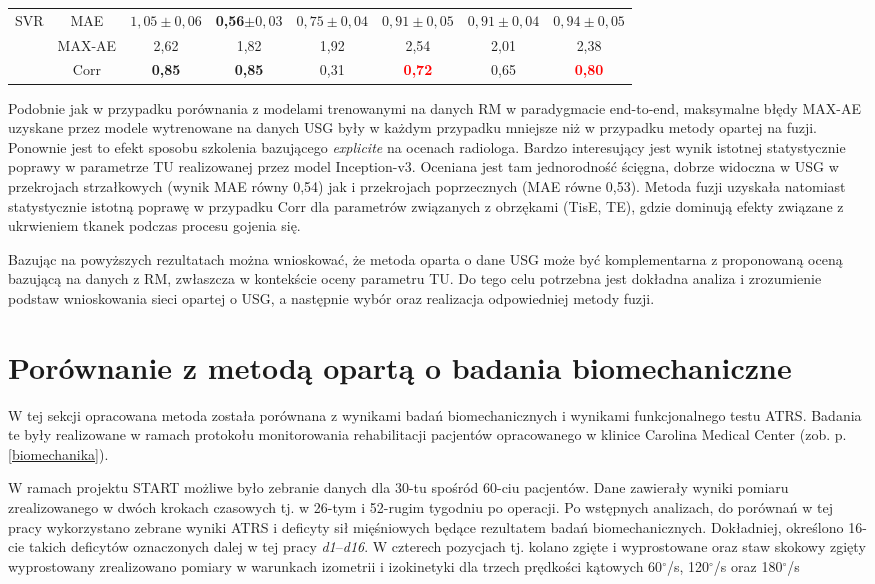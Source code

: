 \begin{table}[h]
\begin{tabular}{lc||c|c|c|c|c|c}
		SVR & MAE & $1,05\pm0,06$ & \textbf{0,56}$\pm0,03$ & $0,75\pm0,04$ & $0,91\pm0,05$ & $0,91\pm0,04$ & $0,94\pm0,05$\\
		& MAX-AE & 2,62 & 1,82 & 1,92 & 2,54 & 2,01 & 2,38 \\
		& Corr   & \textbf{0,85} & \textbf{0,85} & 0,31 & \textcolor{red}{\textbf{0,72}} & 0,65 & \textcolor{red}{\textbf{0,80}} \\
		 
	\end{tabular}
\end{table}
\renewcommand{\arraystretch}{1}

Podobnie jak w przypadku porównania z modelami trenowanymi na danych RM w paradygmacie end-to-end, maksymalne błędy MAX-AE uzyskane przez modele wytrenowane na danych USG były w każdym przypadku mniejsze niż w przypadku metody opartej na fuzji. Ponownie jest to efekt sposobu szkolenia bazującego \textit{explicite} na ocenach radiologa. Bardzo interesujący jest wynik istotnej statystycznie poprawy w parametrze TU realizowanej przez model Inception-v3. Oceniana jest tam jednorodność ścięgna, dobrze widoczna w USG w przekrojach strzałkowych (wynik MAE równy 0,54) jak i przekrojach poprzecznych (MAE równe 0,53). Metoda fuzji uzyskała natomiast statystycznie istotną poprawę w przypadku Corr dla parametrów związanych z obrzękami (TisE, TE), gdzie dominują efekty związane z ukrwieniem tkanek podczas procesu gojenia się.

Bazując na powyższych rezultatach można wnioskować, że metoda oparta o dane USG może być komplementarna z proponowaną oceną bazującą na danych \linebreak z RM, zwłaszcza w kontekście oceny parametru TU. Do tego celu potrzebna jest dokładna analiza i zrozumienie podstaw wnioskowania sieci opartej o USG, a następnie wybór oraz realizacja odpowiedniej metody fuzji.

\section{Porównanie z metodą opartą o badania biomechaniczne}
\label{seq:comp-biomechanics}
W tej sekcji opracowana metoda została porównana z wynikami badań biomechanicznych i wynikami funkcjonalnego testu ATRS. Badania te były realizowane w ramach protokołu monitorowania rehabilitacji pacjentów opracowanego w klinice Carolina Medical Center (zob. p. \ref{biomechanika}). 

W ramach projektu START możliwe było zebranie danych dla 30-tu spośród 60-ciu pacjentów. Dane zawierały wyniki pomiaru zrealizowanego w dwóch krokach czasowych tj. w 26-tym i 52-rugim tygodniu po operacji. Po wstępnych analizach, do porównań w tej pracy wykorzystano zebrane wyniki ATRS i deficyty sił mięśniowych będące rezultatem badań biomechanicznych. Dokładniej, określono 16-cie takich deficytów oznaczonych dalej w tej pracy \textit{d1}--\textit{d16}. W czterech pozycjach tj. kolano zgięte i wyprostowane oraz staw skokowy zgięty wyprostowany zrealizowano pomiary w warunkach izometrii i izokinetyki dla trzech prędkości kątowych 60$^\circ$/s, 120$^\circ$/s oraz 180$^\circ$/s  

